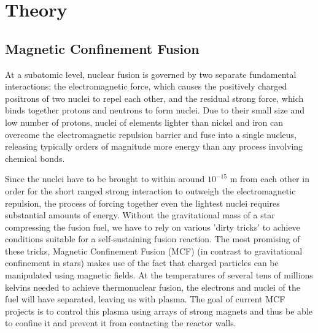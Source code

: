 \chapter{Theory}

\section{Magnetic Confinement Fusion}
At a subatomic level, nuclear fusion is governed by two separate fundamental interactions; the electromagnetic force, which causes the positively charged positrons of two nuclei to repel each other, and the residual strong force, which binds together protons and neutrons to form nuclei. Due to their small size and low number of protons, nuclei of elements lighter than nickel and iron can overcome the electromagnetic repulsion barrier and fuse into a single nucleus, releasing typically orders of magnitude more energy than any process involving chemical bonds.

Since the nuclei have to be brought to within around $10^{-15}$ m from each other in order for the short ranged strong interaction to outweigh the electromagnetic repulsion, the process of forcing together even the lightest nuclei requires substantial amounts of energy.  
Without the gravitational mass of a star compressing the fusion fuel, we have to rely on various 'dirty tricks' to achieve conditions suitable for a self-sustaining fusion reaction. The most promising of these tricks, Magnetic Confinement Fusion (MCF) (in contrast to gravitational confinement in stars) makes use of the fact that charged particles can be manipulated using magnetic fields. At the temperatures of several tens of millions kelvins needed to achieve thermonuclear fusion, the electrons and nuclei of the fuel will have separated, leaving us with plasma. The goal of current MCF projects is to control this plasma using arrays of strong magnets and thus be able to confine it and prevent it from contacting the reactor walls. 

